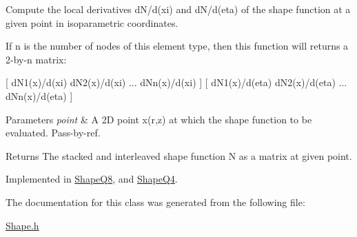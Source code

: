 Compute the local derivatives d\+N/d(xi) and d\+N/d(eta) of the shape function at a given point in isoparametric coordinates. 

If n is the number of nodes of this element type, then this function will returns a 2-\/by-\/n matrix\+:

\mbox{[} d\+N1(x)/d(xi) d\+N2(x)/d(xi) ... d\+Nn(x)/d(xi) \mbox{]} \mbox{[} d\+N1(x)/d(eta) d\+N2(x)/d(eta) ... d\+Nn(x)/d(eta) \mbox{]}


\begin{DoxyParams}{Parameters}
{\em point} & A 2D point x(r,z) at which the shape function to be evaluated. Pass-\/by-\/ref. \\
\hline
\end{DoxyParams}
\begin{DoxyReturn}{Returns}
The stacked and interleaved shape function N as a matrix at given point. 
\end{DoxyReturn}


Implemented in \mbox{\hyperlink{class_shape_q8_ac62182e6804216500c2b290efd5fd06a}{Shape\+Q8}}, and \mbox{\hyperlink{class_shape_q4_ad3e1f5e25aee96cd21b1c8770c35afd0}{Shape\+Q4}}.



The documentation for this class was generated from the following file\+:\begin{DoxyCompactItemize}
\item 
\mbox{\hyperlink{_shape_8h}{Shape.\+h}}\end{DoxyCompactItemize}
